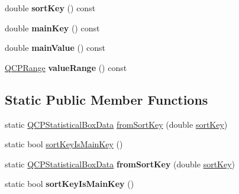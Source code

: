 \begin{DoxyCompactItemize}
double {\bfseries sort\+Key} () const
\item 
\mbox{\label{class_q_c_p_statistical_box_data_a4bbbf44f60ac5eca73c5f4135741562e}} 
double {\bfseries main\+Key} () const
\item 
\mbox{\label{class_q_c_p_statistical_box_data_a0df3cb31cfd6d48decf6173297b81746}} 
double {\bfseries main\+Value} () const
\item 
\mbox{\label{class_q_c_p_statistical_box_data_a1a2410fcf3d45fa3a1ad09e265b9bcad}} 
\hyperlink{class_q_c_p_range}{Q\+C\+P\+Range} {\bfseries value\+Range} () const
\end{DoxyCompactItemize}
\subsection*{Static Public Member Functions}
\begin{DoxyCompactItemize}
\item 
static \hyperlink{class_q_c_p_statistical_box_data}{Q\+C\+P\+Statistical\+Box\+Data} \hyperlink{class_q_c_p_statistical_box_data_a8c391d5a6c7cebc79b664aad9917b499}{from\+Sort\+Key} (double \hyperlink{class_q_c_p_statistical_box_data_a168100275e85935207deec86216abc88}{sort\+Key})
\item 
static bool \hyperlink{class_q_c_p_statistical_box_data_a4710ae44b85d4b34b13c3f9301f28c01}{sort\+Key\+Is\+Main\+Key} ()
\item 
\mbox{\label{class_q_c_p_statistical_box_data_a8c391d5a6c7cebc79b664aad9917b499}} 
static \hyperlink{class_q_c_p_statistical_box_data}{Q\+C\+P\+Statistical\+Box\+Data} {\bfseries from\+Sort\+Key} (double \hyperlink{class_q_c_p_statistical_box_data_a168100275e85935207deec86216abc88}{sort\+Key})
\item 
\mbox{\label{class_q_c_p_statistical_box_data_ad1f57b586f3a473f6f006dc4d505159b}} 
static bool {\bfseries sort\+Key\+Is\+Main\+Key} ()
\end{DoxyCompactItemize}
